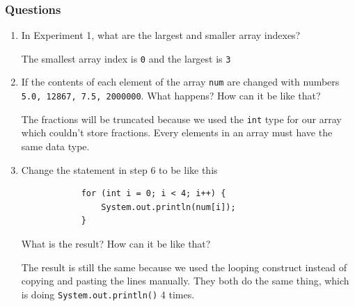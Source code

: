 \documentclass[12pt,titlepage]{article}
\begin{document}
\subsubsection*{Questions}
\begin{enumerate}
    \item {
        In Experiment 1, what are the largest and smaller array indexes?

        The smallest array index is \texttt{0} and the largest is \texttt{3}
    }
    \item {
        If the contents of each element of the array \texttt{num} are changed with numbers
        \texttt{5.0, 12867, 7.5, 2000000}. What happens? How can it be like that?

        The fractions will be truncated because we used the \texttt{int} type for our array which couldn't store fractions.
        Every elements in an array must have the same data type.
    }
    \item {
        Change the statement in step 6 to be like this

        \begin{verbatim}
            for (int i = 0; i < 4; i++) {
                System.out.println(num[i]);
            }
        \end{verbatim}

        What is the result? How can it be like that?

        The result is still the same because we used the looping construct instead of copying and pasting the lines manually.
        They both do the same thing, which is doing \texttt{System.out.println()} 4 times.
    }
\end{enumerate}
\end{document}
